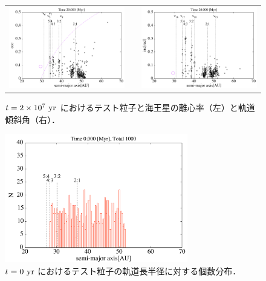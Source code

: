 \documentclass[11pt,a4paper,oneside,onecolumn]{jreport}
\begin{document}
\begin{figure}[H]
\begin{tabular}{ccc}
\begin{minipage}[t]{0.45\hsize}
\centering
\includegraphics[width=8cm]{./image/kuiper_ecc_20Myr.pdf}
\end{minipage} &
\begin{minipage}[t]{0.1\hsize}
\end{minipage} &
\begin{minipage}[t]{0.45\hsize}
\centering
\includegraphics[width=8cm]{./image/kuiper_inc_20Myr.pdf}
\end{minipage}\\
%
\end{tabular}
\caption{$t = 2 \times 10^7\ {\rm yr}$ におけるテスト粒子と海王星の離心率（左）と軌道傾斜角（右）．\label{fig:kuiper_ecc_inc_20Myr}}
\end{figure}





\begin{figure}[H]
\centering
\includegraphics[width=8cm]{./image/kuiper_histogram_0yr.pdf}
\caption{$t = 0\ {\rm yr}$ におけるテスト粒子の軌道長半径に対する個数分布．\label{fig:kuiper_histogram_0yr}}
\end{figure}
\end{document}
